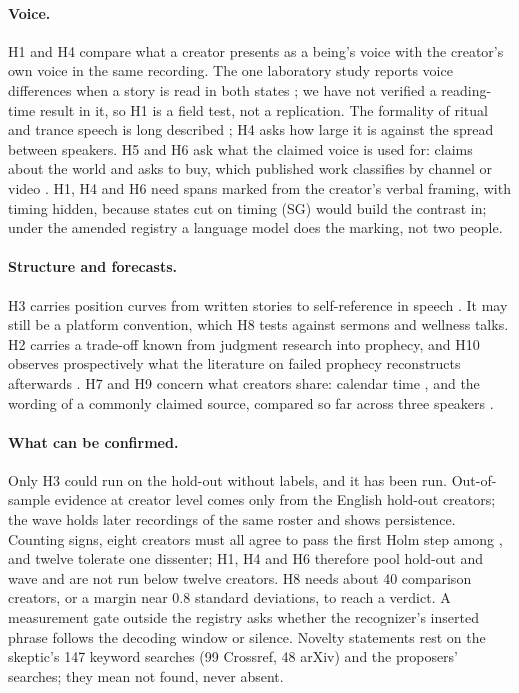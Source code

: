 \documentclass[letterpaper]{article} %
\newcommand{\expid}[1]{\textsc{#1}}
\begin{document}
\paragraph{Voice.} H1 and H4 compare what a creator presents as a being's voice with the creator's own voice in the same recording. The one laboratory study reports voice differences when a story is read in both states \cite{wahbeh2019physiological}; we have not verified a reading-time result in it, so H1 is a field test, not a replication. The formality of ritual and trance speech is long described \cite{irvine1979formality,keane1997religious,hughes1991blending}; H4 asks how large it is against the spread between speakers. H5 and H6 ask what the claimed voice is used for: claims about the world \cite{hammer2001claiming} and asks to buy, which published work classifies by channel or video \cite{hua2022characterizing,ballard2022conspiracy}. H1, H4 and H6 need spans marked from the creator's verbal framing, with timing hidden, because states cut on timing (\expid{SG}) would build the contrast in; under the amended registry a language model does the marking, not two people.

\paragraph{Structure and forecasts.} H3 carries position curves from written stories \cite{boyd2020narrative} to self-reference in speech \cite{goffman1979footing}. It may still be a platform convention, which H8 tests against sermons and wellness talks. H2 carries a trade-off known from judgment research \cite{yaniv1995graininess} into prophecy, and H10 observes prospectively what the literature on failed prophecy reconstructs afterwards \cite{dawson1999prophecy,zygmunt1972prophecies}. H7 and H9 concern what creators share: calendar time \cite{leskovec2009memetracking}, and the wording of a commonly claimed source, compared so far across three speakers \cite{wahbeh2026semantic}.

\paragraph{What can be confirmed.} Only H3 could run on the hold-out without labels, and it has been run. Out-of-sample evidence at creator level comes only from the \NHoldoutNotNonEnglish{} English hold-out creators; the wave holds later recordings of the same roster and shows persistence. Counting signs, eight creators must all agree to pass the first Holm step among \NMaxConfirmatory, and twelve tolerate one dissenter; H1, H4 and H6 therefore pool hold-out and wave and are not run below twelve creators. H8 needs about 40 comparison creators, or a margin near 0.8 standard deviations, to reach a verdict. A measurement gate outside the registry asks whether the recognizer's inserted phrase follows the decoding window or silence. Novelty statements rest on the skeptic's 147 keyword searches (99 Crossref, 48 arXiv) and the proposers' searches; they mean not found, never absent.
\end{document}

